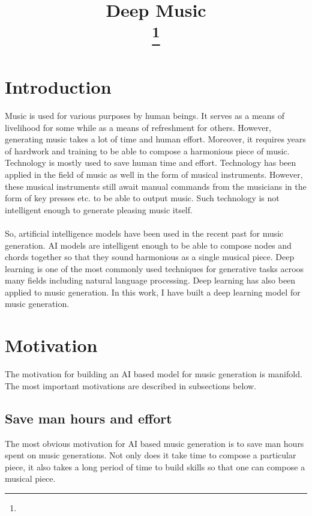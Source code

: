 \documentclass[conference]{IEEEtran}
\begin{document}
\title{Deep Music\\
{\footnotesize
}
\thanks{}
}

\author{

}

\maketitle

\section{Introduction}
Music is used for various purposes by human beings. It serves as a means of livelihood for some while as a means of refreshment for others. However, generating music takes a lot of time and human effort. Moreover, it requires years of hardwork and training to be able to compose a harmonious piece of music. Technology is mostly used to save human time and effort. Technology has been applied in the field of music as well in the form of musical instruments. However, these musical instruments still await manual commands from the musicians in the form of key presses etc. to be able to output music. Such technology is not intelligent enough to generate pleasing music itself. \\\\
So, artificial intelligence models have been used in the recent past for music generation. AI models are intelligent enough to be able to compose nodes and chords together so that they sound harmonious as a single musical piece. Deep learning is one of the most commonly used techniques for generative tasks acroos many fields including natural language processing. Deep learning has also been applied to music generation. In this work, I have built a deep learning model for music generation.
\section{Motivation}
The motivation for building an AI based model for music generation is manifold. The most important motivations are described in subsections below.
\subsection{Save man hours and effort}
The most obvious motivation for AI based music generation is to save man hours spent on music generations. Not only does it take time to compose a particular piece, it also takes a long period of time to build skills so that one can compose a musical piece.
\end{document}
